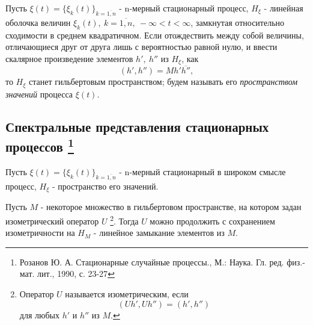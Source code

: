 Пусть $\xi(t) = \{\xi_k(t)\}_{k=\overline{1,n}}$ - n-мерный стационарный процесс, $H_\xi$ - линейная оболочка величин $\xi_k(t), \ k=\overline{1,n}, \ -\infty<t<\infty$, замкнутая относительно сходимости в среднем квадратичном. Если отождествить между собой величины, отличающиеся друг от друга лишь с вероятностью равной нулю, и ввести скалярное произведение элементов $h', \ h''$ из $H_\xi$, как $$(h',h'') = Mh'\overline{h''},$$ то $H_\xi$ станет гильбертовым пространством; будем называть его \emph{пространством значений} процесса $\xi(t)$.

\subsection{Спектральные представления стационарных процессов \footnote{Розанов Ю. А. Стационарные случайные процессы., М.: Наука. Гл. ред. физ.-мат. лит., 1990, с. 23-27}}

Пусть $\xi(t)=\{\xi_k(t)\}_{k=\overline{1,n}}$ - n-мерный стационарный в широком смысле процесс, $H_\xi$ - пространство его значений.

\begin{lemma}\label{hellopuza_lemma_2.1} Пусть $M$ - некоторое множество в гильбертовом пространстве, на котором задан изометрический оператор $U$ \footnote{Оператор $U$ называется изометрическим, если $$(Uh',Uh'') = (h',h'')$$ для любых $h'$ и $h''$ из $M$.}. Тогда $U$ можно продолжить с сохранением изометричности на $H_M$ - линейное замыкание элементов из $M$.
\end{lemma}


